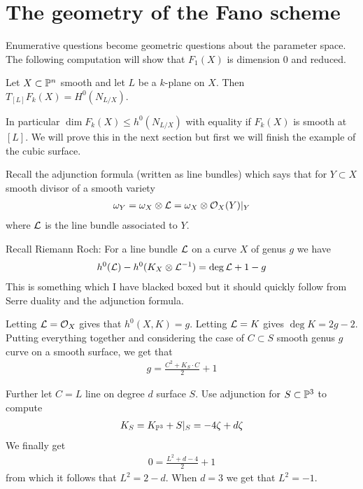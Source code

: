 \documentclass[12pt]{article}
\begin{document}
\section{The geometry of the Fano scheme}
Enumerative questions become geometric questions about the parameter space. The
following computation will show that $F_1(X)$ is dimension $0$ and reduced.

\begin{proposition}
    Let $X\subset \P^n$ smooth and let $L$ be a $k$-plane on $X$. Then 
    $T_{[L]}F_k(X) = H^0(N_{L/X})$.
\end{proposition} In particular $\dim F_k(X) \leq h^0(N_{L/X})$ with 
equality if $F_k(X)$ is smooth at $[L]$. We will prove this in the next section but
first we will finish the example of the cubic surface.

\hfill

Recall the adjunction formula (written as line bundles) which says that for $Y\subset X$ smooth 
divisor of a smooth variety \begin{align*}
    \omega_Y = \omega_X \otimes \cL = \omega_X \otimes \cO_X(Y)\vert_Y
\end{align*} where $\cL$ is the line bundle associated to $Y$.

\hfill

Recall Riemann Roch: For a line bundle $\cL$ on a curve $X$ of genus $g$ we have 
\begin{align*}
    h^0(\cL) - h^0(K_X \otimes \cL^{-1}) = \deg \cL + 1 - g
\end{align*} This is something which I have blacked boxed but 
it should quickly follow from Serre duality and the adjunction formula.

\hfill

Letting $\cL = \cO_X$ gives that $h^0(X,K) = g$. Letting $\cL = K$ gives $\deg K = 2g-2$.
Putting everything together and considering the case of $C\subset S$ smooth genus $g$ 
curve on a smooth surface, we get that \begin{align*}
    g = \frac{C^2 + K_S\cdot C}{2} + 1
\end{align*}

\hfill

Further let $C = L$ line on degree $d$ surface $S$. 
Use adjunction for $S\subset \P^3$ to compute \begin{align*}
    K_S = K_{\P^3} + S\vert_S = -4\zeta + d\zeta
\end{align*} We finally get \begin{align*}
    0 = \frac{L^2 + d - 4}{2} +1
\end{align*} from which it follows that $L^2 = 2 - d$. When $d = 3$ we get that $L^2 = -1$.
\end{document}
